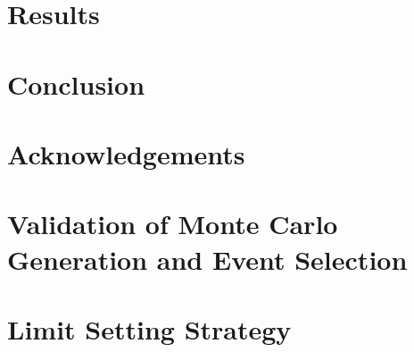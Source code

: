 \documentclass[a4paper,11pt]{article}
\renewcommand{\=}[1]{\stackrel{#1}{=}} %
\begin{document}
\section{Results} 
\label{sec:sec4}


\section{Conclusion} 
\label{sec:sec5}


\section{Acknowledgements} 
\label{sec:sec6}

\appendix
\section{Validation of Monte Carlo Generation and Event Selection }
\label{AppendixA}


\section{Limit Setting Strategy}
\label{AppendixB}


\begin{thebibliography}{99}

\end{thebibliography}
\end{document}
